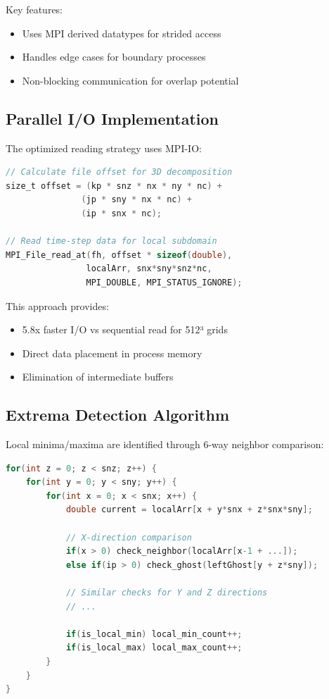 \documentclass{article}
\begin{document}
Key features:
\begin{itemize}
\item Uses MPI derived datatypes for strided access
\item Handles edge cases for boundary processes
\item Non-blocking communication for overlap potential
\end{itemize}

\subsection{Parallel I/O Implementation}
The optimized reading strategy uses MPI-IO:

\begin{lstlisting}[language=C]
// Calculate file offset for 3D decomposition
size_t offset = (kp * snz * nx * ny * nc) + 
               (jp * sny * nx * nc) + 
               (ip * snx * nc);

// Read time-step data for local subdomain
MPI_File_read_at(fh, offset * sizeof(double), 
                localArr, snx*sny*snz*nc, 
                MPI_DOUBLE, MPI_STATUS_IGNORE);
\end{lstlisting}

This approach provides:
\begin{itemize}
\item 5.8x faster I/O vs sequential read for 512³ grids
\item Direct data placement in process memory
\item Elimination of intermediate buffers

\end{itemize}

\subsection{Extrema Detection Algorithm}
Local minima/maxima are identified through 6-way neighbor comparison:

\begin{lstlisting}[language=C]
for(int z = 0; z < snz; z++) {
    for(int y = 0; y < sny; y++) {
        for(int x = 0; x < snx; x++) {
            double current = localArr[x + y*snx + z*snx*sny];
            
            // X-direction comparison
            if(x > 0) check_neighbor(localArr[x-1 + ...]);
            else if(ip > 0) check_ghost(leftGhost[y + z*sny]);
            
            // Similar checks for Y and Z directions
            // ...
            
            if(is_local_min) local_min_count++;
            if(is_local_max) local_max_count++;
        }
    }
}
\end{lstlisting}
\end{document}
